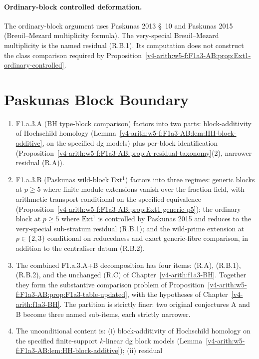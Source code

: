 \paragraph{Ordinary-block controlled deformation.} The ordinary-block
argument uses Paskunas 2013 \S~10 and Paskunas 2015 (Breuil--Mezard
multiplicity formula). The very-special Breuil--Mezard multiplicity
is the named residual (R.B.1). Its computation does not construct
the class comparison required by
Proposition~\ref{v4-arith:w5-f:F1a3-AB:prop:Ext1-ordinary-controlled}.

\section{Paskunas Block Boundary}
\label{v4-arith:w5-f:F1a3-AB:summary}

\begin{enumerate}
\item F1.a.3.A (BH type-block comparison) factors into two parts: block-additivity
of Hochschild homology
(Lemma~\ref{v4-arith:w5-f:F1a3-AB:lem:HH-block-additive}, on the
specified dg models)
plus per-block identification
(Proposition~\ref{v4-arith:w5-f:F1a3-AB:prop:A-residual-taxonomy}(2), narrower
residual (R.A)).
\item F1.a.3.B (Paskunas wild-block Ext\({}^{1}\)) factors into three
regimes: generic blocks at \(p\geq 5\) where
finite-module extensions vanish over the fraction field, with
arithmetic transport conditional on the specified equivalence
(Proposition~\ref{v4-arith:w5-f:F1a3-AB:prop:Ext1-generic-p5}); the ordinary
block at \(p\geq 5\) where \(\mathrm{Ext}^{1}\) is controlled by
Paskunas 2015 and reduces to the very-special sub-stratum
residual (R.B.1); and the wild-prime extension at
\(p\in\{2,3\}\) conditional on reducedness and exact generic-fibre
comparison, in addition to the centraliser datum (R.B.2).
\item The combined F1.a.3.A+B decomposition has four items:
(R.A), (R.B.1), (R.B.2), and the unchanged (R.C) of
Chapter~\ref{v4-arith:f1a3-BH}. Together they form the substantive
comparison problem of
Proposition~\ref{v4-arith:w5-f:F1a3-AB:prop:F1a3-table-updated}, with the
hypotheses of Chapter~\ref{v4-arith:f1a3-BH}. The
partition is strictly finer: two original conjectures A and B become
three named sub-items, each strictly narrower.
\item The unconditional content is: (i) block-additivity
of Hochschild homology on the specified finite-support
\(k\)-linear dg block models
(Lemma~\ref{v4-arith:w5-f:F1a3-AB:lem:HH-block-additive}); (ii) residual

\end{enumerate}
